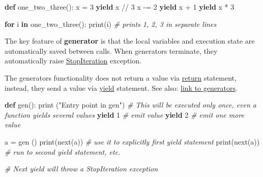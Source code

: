 \documentclass[
]{article}
\newenvironment{Shaded}{}{}
\newcommand{\BuiltInTok}[1]{#1}
\newcommand{\CommentTok}[1]{\textcolor[rgb]{0.38,0.63,0.69}{\textit{#1}}}
\newcommand{\ControlFlowTok}[1]{\textcolor[rgb]{0.00,0.44,0.13}{\textbf{#1}}}
\newcommand{\DecValTok}[1]{\textcolor[rgb]{0.25,0.63,0.44}{#1}}
\newcommand{\KeywordTok}[1]{\textcolor[rgb]{0.00,0.44,0.13}{\textbf{#1}}}
\newcommand{\NormalTok}[1]{#1}
\newcommand{\OperatorTok}[1]{\textcolor[rgb]{0.40,0.40,0.40}{#1}}
\newcommand{\StringTok}[1]{\textcolor[rgb]{0.25,0.44,0.63}{#1}}
\begin{document}
\begin{Shaded}
\begin{Highlighting}[]
\KeywordTok{def}\NormalTok{ one\_two\_three():}
\NormalTok{    x }\OperatorTok{=} \DecValTok{3}
    \ControlFlowTok{yield}\NormalTok{ x }\OperatorTok{//} \DecValTok{3}
\NormalTok{    x }\OperatorTok{{-}=} \DecValTok{2}
    \ControlFlowTok{yield}\NormalTok{ x }\OperatorTok{+} \DecValTok{1}
    \ControlFlowTok{yield}\NormalTok{ x }\OperatorTok{*} \DecValTok{3}
        
\ControlFlowTok{for}\NormalTok{ i }\KeywordTok{in}\NormalTok{ one\_two\_three():}
    \BuiltInTok{print}\NormalTok{(i)  }\CommentTok{\# prints 1, 2, 3 in separate lines}
\end{Highlighting}
\end{Shaded}

The key feature of \textbf{generator} is that the local variables and
execution state are automatically saved between calls. When generators
terminate, they automatically raise
\href{https://docs.python.org/3/library/exceptions.html?highlight=stopiteration\#StopIteration}{StopIteration}
exception.

The generators functionality does not return a value via
\href{https://docs.python.org/3/reference/simple_stmts.html?highlight=return\#return}{return}
statement, instead, they send a value via
\href{https://docs.python.org/3/reference/simple_stmts.html?highlight=return\#grammar-token-python-grammar-yield_stmt}{yield}
statement. See also:
\href{\%0Ahttps://docs.python.org/3/tutorial/classes.html\#generators}{link
to generators}.

\begin{Shaded}
\begin{Highlighting}[]
\KeywordTok{def}\NormalTok{ gen():     }
    \BuiltInTok{print}\NormalTok{ (}\StringTok{"Entry point in gen"}\NormalTok{) }\CommentTok{\# This will be executed only once, even a function yields several values}
    \ControlFlowTok{yield} \DecValTok{1} \CommentTok{\# emit value      }
    \ControlFlowTok{yield} \DecValTok{2} \CommentTok{\# emit one more value   }

\NormalTok{a }\OperatorTok{=}\NormalTok{ gen ()}
\BuiltInTok{print}\NormalTok{(}\BuiltInTok{next}\NormalTok{(a))   }\CommentTok{\# use it to explicitly first yield statement}
\BuiltInTok{print}\NormalTok{(}\BuiltInTok{next}\NormalTok{(a))   }\CommentTok{\# run to second yield statement, etc. }

\CommentTok{\# Next yield will throw a StopIteration exception    }
\end{Highlighting}
\end{Shaded}
\end{document}
